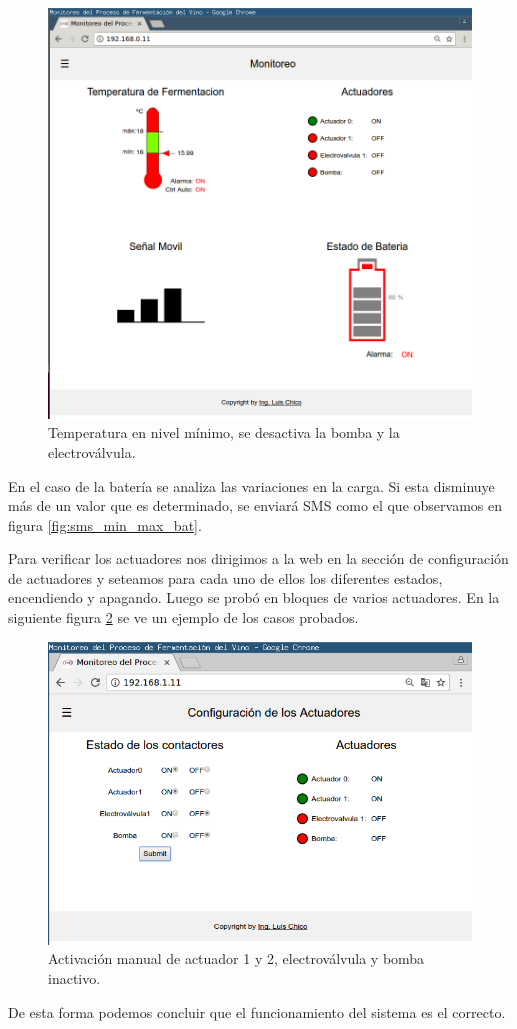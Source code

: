 \begin{figure}[h]
  \centering
  \includegraphics[scale=.25]{./Figures/auto_control_inactive.png}
  \caption{Temperatura en nivel mínimo, se desactiva la bomba y la electroválvula.}
  \label{fig:auto_control_inactive}
\end{figure}


En el caso de la batería se analiza las variaciones en la carga. Si esta disminuye más de un valor que es determinado, se enviará SMS como el que observamos en figura \ref{fig:sms_min_max_bat}. 

Para verificar los actuadores nos dirigimos a la web en la sección de configuración de actuadores y seteamos para cada uno de ellos los diferentes estados, encendiendo y apagando. Luego se probó en bloques de varios actuadores. En la siguiente figura \ref{fig:test_contact} se ve un ejemplo de los casos probados.

\begin{figure}[h]
  \centering
  \includegraphics[scale=.25]{./Figures/test_contact.png}
  \caption{Activación manual de actuador 1 y 2, electroválvula y bomba inactivo.}
  \label{fig:test_contact}
\end{figure}


De esta forma podemos concluir que el funcionamiento del sistema es el correcto.





